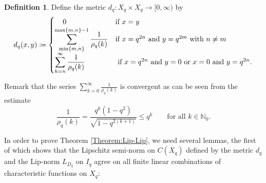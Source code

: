 \documentclass[11pt, reqno, a4paper, final]{amsart}
\theoremstyle{plain}
\theoremstyle{definition}
\newtheorem{definition}[thm]{Definition}
\newcommand{\NN}{{\mathbb N}}
\renewcommand{\min}{{\operatorname{min}}}
\renewcommand{\leq}{\leqslant}
\newcommand{\black}{\color{black}}
\begin{document}
\begin{definition} Define the {\black metric} $d_q\colon X_q\times X_q \to [0,\infty)$ by
\begin{align*}
d_q(x,y)\coloneqq
\begin{cases} \hspace{0.4cm }0 &\mbox{if } x=y \\
 \displaystyle\sum_{\min\lbrace m,n \rbrace}^{\max\lbrace m,n \rbrace-1} \frac{1}{\rho_q(k)} & \mbox{if } {\black x=q^{2n}} \text{ and } {\black y=q^{2m}}  \text{ with } n\neq m \\
 \displaystyle\sum_{k=n}^\infty\frac{1}{\rho_q(k)} & \text{ if } {\black x=q^{2n}} \text{ and } y=0 \text{ or } x=0 \text{ and } {\black y=q^{2n}}. 
  \end{cases}
\end{align*}
\end{definition}
{\black Remark that the series $\sum_{k=0}^\infty \frac{1}{\rho_q(k)}$ is convergent as can be seen from the estimate 
\begin{equation}\label{eq:estrho}
\frac{1}{\rho_q(k)} = \frac{q^k (1-q^2)}{\sqrt{1 - q^{2(k+1)}}} \leq q^k  \qquad \mbox{for all } k \in \NN_0 . 
\end{equation}}
%

In order to prove Theorem \ref{Theorem:Lip-Lip}, we need several lemmas, the first of which shows that the Lipschitz semi-norm on $C(X_q)$ defined by the metric $d_q$ and the Lip-norm $L_{D_{q}}$ on $I_q$ agree on all finite linear combinations of characteristic functions on $X_q$:
\end{document}
